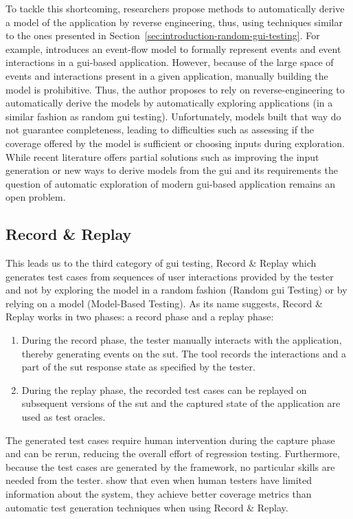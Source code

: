 To tackle this shortcoming, researchers propose methods to automatically derive a model of the application by reverse engineering, thus, using techniques similar to the ones presented in Section~\ref{sec:introduction-random-gui-testing}. For example, \textcite{Memon2007} introduces an event-flow model to formally represent events and event interactions in a \gls{gui}-based application. However, because of the large space of events and interactions present in a given application, manually building the model is prohibitive. Thus, the author proposes to rely on reverse-engineering to automatically derive the models by automatically exploring applications (in a similar fashion as random \gls{gui} testing). Unfortunately, models built that way do not guarantee completeness, leading to difficulties such as assessing if the coverage offered by the model is sufficient or choosing inputs during exploration. While recent literature offers partial solutions such as improving the input generation \cite{Biagiola2019} or new ways to derive models from the \gls{gui} and its requirements \cite{Canny2020} the question of automatic exploration of modern \gls{gui}-based application remains an open problem.

\subsection{Record \& Replay}
\label{sec:introduction-record-and-replay}

This leads us to the third category of \gls{gui} testing, Record \& Replay which generates test cases from sequences of user interactions provided by the tester and not by exploring the model in a random fashion (Random \gls{gui} Testing) or by relying on a model (Model-Based Testing). As its name suggests, Record \& Replay works in two phases: a record phase and a replay phase:

\begin{enumerate}
    \item During the record phase, the tester manually interacts with the application, thereby generating events on the \gls{sut}. The tool records the interactions and a part of the \gls{sut} response state as specified by the tester.
    \item During the replay phase, the recorded test cases can be replayed on subsequent versions of the \gls{sut} and the captured state of the application are used as test oracles.
\end{enumerate}

The generated test cases require human intervention during the capture phase and can be rerun, reducing the overall effort of regression testing. Furthermore, because the test cases are generated by the framework, no particular skills are needed from the tester. \textcite{DiMartino2021} show that even when human testers have limited information about the system, they achieve better coverage metrics than automatic test generation techniques when using Record \& Replay.

